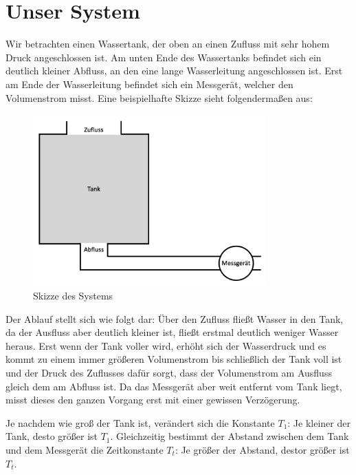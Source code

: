 \section{Unser System}
Wir betrachten einen Wassertank, der oben an einen Zufluss mit sehr hohem Druck angeschlossen ist. Am unten Ende des Wassertanks befindet sich ein deutlich kleiner Abfluss, an den eine lange Wasserleitung angeschlossen ist. Erst am Ende der Wasserleitung befindet sich ein Messgerät, welcher den Volumenstrom misst.
Eine beispielhafte Skizze sieht folgendermaßen aus:
\begin{figure}[H]
    \label{fig:tank}
    \centering
    \includegraphics[width=0.8\textwidth]{Bilder/Tank.png}
    \caption{Skizze des Systems}
 \end{figure}
Der Ablauf stellt sich wie folgt dar: Über den Zufluss fließt Wasser in den Tank, da der Ausfluss aber deutlich kleiner ist, fließt erstmal deutlich weniger Wasser heraus. Erst wenn der Tank voller wird, erhöht sich der Wasserdruck und es kommt zu einem immer größeren Volumenstrom bis schließlich der Tank voll ist und der Druck des Zuflusses dafür sorgt, dass der Volumenstrom am Ausfluss gleich dem am Abfluss ist. Da das Messgerät aber weit entfernt vom Tank liegt, misst dieses den ganzen Vorgang erst mit einer gewissen Verzögerung.

Je nachdem wie groß der Tank ist, verändert sich die Konstante $T_1$: Je kleiner der Tank, desto größer ist $T_1$. Gleichzeitig bestimmt der Abstand zwischen dem Tank und dem Messgerät die Zeitkonstante $T_t$: Je größer der Abstand, destor größer ist $T_t$.

